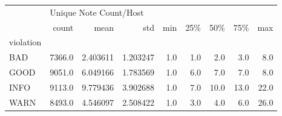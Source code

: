 \begin{tabular}{lrrrrrrrr}
\toprule
{} & \multicolumn{8}{l}{Unique Note Count/Host} \\
{} &                  count &      mean &       std &  min &  25\% &   50\% &   75\% &   max \\
violation &                        &           &           &      &      &       &       &       \\
\midrule
BAD       &                 7366.0 &  2.403611 &  1.203247 &  1.0 &  1.0 &   2.0 &   3.0 &   8.0 \\
GOOD      &                 9051.0 &  6.049166 &  1.783569 &  1.0 &  6.0 &   7.0 &   7.0 &   8.0 \\
INFO      &                 9113.0 &  9.779436 &  3.902688 &  1.0 &  7.0 &  10.0 &  13.0 &  22.0 \\
WARN      &                 8493.0 &  4.546097 &  2.508422 &  1.0 &  3.0 &   4.0 &   6.0 &  26.0 \\
\bottomrule
\end{tabular}
